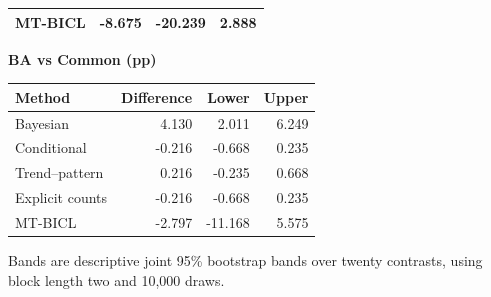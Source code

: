 \begin{table}[htb]
\begin{minipage}[t]{0.48\textwidth}
\begin{tabular}{lrrr}
MT-BICL & -8.675 & -20.239 & 2.888 \\
\hline
\end{tabular}
\end{minipage}\hfill
\begin{minipage}[t]{0.48\textwidth}
\centering
\textbf{BA vs Common (pp)}\par\smallskip
\begin{tabular}{lrrr}
\hline
Method & Difference & Lower & Upper \\
\hline
Bayesian & 4.130 & 2.011 & 6.249 \\
Conditional & -0.216 & -0.668 & 0.235 \\
Trend--pattern & 0.216 & -0.235 & 0.668 \\
Explicit counts & -0.216 & -0.668 & 0.235 \\
MT-BICL & -2.797 & -11.168 & 5.575 \\
\hline
\end{tabular}
\end{minipage}\par\medskip
\begin{minipage}{\textwidth}\footnotesize Bands are descriptive joint 95\% bootstrap bands over twenty contrasts, using block length two and 10,000 draws.\end{minipage}
\end{table}
